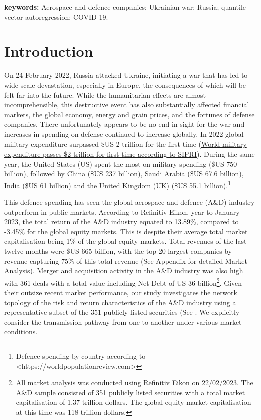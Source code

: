 \documentclass[
  letterpaper,
  DIV=11,
  numbers=noendperiod]{scrartcl}
\begin{document}
\textbf{keywords:} Aerospace and defence companies; Ukrainian war;
Russia; quantile vector-autoregression; COVID-19.

\hypertarget{introduction}{%
\section{Introduction}\label{introduction}}

On 24 February 2022, Russia attacked Ukraine, initiating a war that has
led to wide scale devastation, especially in Europe, the consequences of
which will be felt far into the future. While the humanitarian effects
are almost incomprehensible, this destructive event has also
substantially affected financial markets, the global economy, energy and
grain prices, and the fortunes of defense companies. There unfortunately
appears to be no end in sight for the war and increases in spending on
defense continued to increase globally. In 2022 global military
expenditure surpassed \$US 2 trillion for the first time
(\href{https://www.sipri.org/media/press-release/2022/world-military-expenditure-passes-2-trillion-first-time}{World
military expenditure passes \$2 trillion for first time according to
SIPRI}). During the same year, the United States (US) spent the most on
military spending (\$US 750 billion), followed by China (\$US 237
billion), Saudi Arabia (\$US 67.6 billion), India (\$US 61 billion) and
the United Kingdom (UK) (\$US 55.1 billion).\footnote{Defence spending
  by country according to
  \textless https://worldpopulationreview.com\textgreater{}}

This defence spending has seen the global aerospace and defence (A\&D)
industry outperform in public markets. According to Refinitiv Eikon,
year to January 2023, the total return of the A\&D industry equated to
13.89\%, compared to -3.45\% for the global equity markets. This is
despite their average total market capitalisation being 1\% of the
global equity markets. Total revenues of the last twelve months were
\$US 665 billion, with the top 20 largest companies by revenue capturing
75\% of this total revenue (See Appendix for detailed Market Analysis).
Merger and acquisition activity in the A\&D industry was also high with
361 deals with a total value including Net Debt of US 36
billion\footnote{All market analysis was conducted using Refinitiv Eikon
  on 22/02/2023. The A\&D sample consisted of 351 publicly listed
  securities with a total market capitalisation of 1.37 trillion
  dollars. The global equity market capitalisation at this time was 118
  trillion dollars.}. Given their outsize recent market performance, our
study investigates the network topology of the risk and return
characteristics of the A\&D industry using a representative subset of
the 351 publicly listed securities (See . We explicitly consider the
transmission pathway from one to another under various market
conditions.
\end{document}
